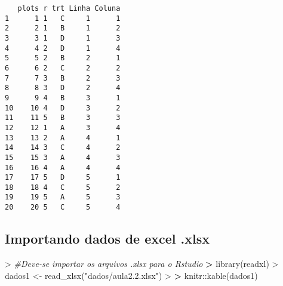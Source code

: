\documentclass[
]{book}
\newenvironment{Shaded}{\begin{snugshade}}{\end{snugshade}}
\newcommand{\AttributeTok}[1]{\textcolor[rgb]{0.77,0.63,0.00}{#1}}
\newcommand{\CommentTok}[1]{\textcolor[rgb]{0.56,0.35,0.01}{\textit{#1}}}
\newcommand{\DecValTok}[1]{\textcolor[rgb]{0.00,0.00,0.81}{#1}}
\newcommand{\ErrorTok}[1]{\textcolor[rgb]{0.64,0.00,0.00}{\textbf{#1}}}
\newcommand{\FunctionTok}[1]{\textcolor[rgb]{0.00,0.00,0.00}{#1}}
\newcommand{\NormalTok}[1]{#1}
\newcommand{\OtherTok}[1]{\textcolor[rgb]{0.56,0.35,0.01}{#1}}
\newcommand{\SpecialCharTok}[1]{\textcolor[rgb]{0.00,0.00,0.00}{#1}}
\newcommand{\StringTok}[1]{\textcolor[rgb]{0.31,0.60,0.02}{#1}}
\begin{document}
\begin{Shaded}
\end{Shaded}

\begin{verbatim}
   plots r trt Linha Coluna
1      1 1   C     1      1
2      2 1   B     1      2
3      3 1   D     1      3
4      4 2   D     1      4
5      5 2   B     2      1
6      6 2   C     2      2
7      7 3   B     2      3
8      8 3   D     2      4
9      9 4   B     3      1
10    10 4   D     3      2
11    11 5   B     3      3
12    12 1   A     3      4
13    13 2   A     4      1
14    14 3   C     4      2
15    15 3   A     4      3
16    16 4   A     4      4
17    17 5   D     5      1
18    18 4   C     5      2
19    19 5   A     5      3
20    20 5   C     5      4
\end{verbatim}

\hypertarget{importando-dados-de-excel-.xlsx}{%
\subsection{Importando dados de excel .xlsx}\label{importando-dados-de-excel-.xlsx}}

\begin{Shaded}
\begin{Highlighting}[]
\SpecialCharTok{\textgreater{}} \CommentTok{\#Deve{-}se importar os arquivos .xlsx para o Rstudio}
\ErrorTok{\textgreater{}} \FunctionTok{library}\NormalTok{(readxl)}
\SpecialCharTok{\textgreater{}}\NormalTok{ dados1 }\OtherTok{\textless{}{-}} \FunctionTok{read\_xlsx}\NormalTok{(}\StringTok{"dados/aula2.2.xlsx"}\NormalTok{)}
\SpecialCharTok{\textgreater{}} 
\ErrorTok{\textgreater{}}\NormalTok{ knitr}\SpecialCharTok{::}\FunctionTok{kable}\NormalTok{(dados1)}
\end{Highlighting}
\end{Shaded}
\end{document}
